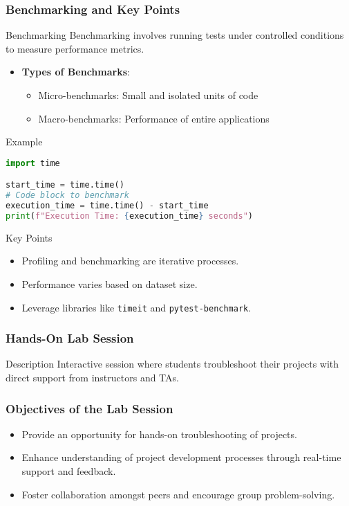 \documentclass[aspectratio=169]{beamer}
\begin{document}
\begin{frame}[fragile]
    \frametitle{Benchmarking and Key Points}
    \begin{block}{Benchmarking}
        Benchmarking involves running tests under controlled conditions to measure performance metrics.
    \end{block}
    \begin{itemize}
        \item \textbf{Types of Benchmarks}:
        \begin{itemize}
            \item Micro-benchmarks: Small and isolated units of code
            \item Macro-benchmarks: Performance of entire applications
        \end{itemize}
    \end{itemize}
    \begin{block}{Example}
        \begin{lstlisting}[language=Python]
import time

start_time = time.time()
# Code block to benchmark
execution_time = time.time() - start_time
print(f"Execution Time: {execution_time} seconds")
        \end{lstlisting}
    \end{block}
    
    \begin{block}{Key Points}
        \begin{itemize}
            \item Profiling and benchmarking are iterative processes.
            \item Performance varies based on dataset size.
            \item Leverage libraries like \texttt{timeit} and \texttt{pytest-benchmark}.
        \end{itemize}
    \end{block}
\end{frame}

\begin{frame}[fragile]
    \frametitle{Hands-On Lab Session}
    \begin{block}{Description}
        Interactive session where students troubleshoot their projects with direct support from instructors and TAs.
    \end{block}
\end{frame}

\begin{frame}[fragile]
    \frametitle{Objectives of the Lab Session}
    \begin{itemize}
        \item Provide an opportunity for hands-on troubleshooting of projects.
        \item Enhance understanding of project development processes through real-time support and feedback.
        \item Foster collaboration amongst peers and encourage group problem-solving.
    \end{itemize}
\end{frame}
\end{document}
